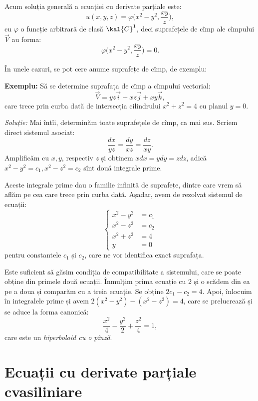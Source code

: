 Acum soluția generală a ecuației cu derivate parțiale este:
\[
  u(x, y, z) = \varphi\Big(x^2 - y^2, \dfrac{xy}{z} \Big),
\]
cu $ \varphi $ o funcție arbitrară de clasă $ \kal{C}^1 $, deci suprafețele de
cîmp ale cîmpului $ \vec{V} $ au forma:
\[
  \varphi\Big( x^2 - y^2, \dfrac{xy}{z} \Big) = 0.
\]

\vspace{1cm}

În unele cazuri, se pot cere anume suprafețe de cîmp, de exemplu:

\textbf{Exemplu:} Să se determine suprafața de cîmp a cîmpului vectorial:
\[
  \vec{V} = yz\vec{i} + xz \vec{j} + xy\vec{k},
\]
care trece prin curba dată de intersecția cilindrului $ x^2 + z^2 = 4 $ cu
planul $ y = 0 $.

\emph{Soluție:} Mai întîi, determinăm toate suprafețele de cîmp, ca mai sus.
Scriem direct sistemul asociat:
\[
  \dfrac{dx}{yz} = \dfrac{dy}{xz} = \dfrac{dz}{xy}.
\]
Amplificăm cu $ x, y $, respectiv $ z $ și obținem $ xdx = ydy = zdz $, adică
$ x^2 - y^2 = c_1, x^2 - z^2 = c_2 $ sînt două integrale prime.

Aceste integrale prime dau o familie infinită de suprafețe, dintre care
vrem să aflăm pe cea care trece prin curba dată. Așadar, avem de rezolvat
sistemul de ecuații:
\[
  \begin{cases}
    x^2 - y^2 &= c_1  \\
    x^2 - z^2 &= c_2 \\
    x^2 + z^2 &= 4 \\
    y &= 0
  \end{cases}
\]
pentru constantele $ c_1 $ și $ c_2 $, care ne vor identifica exact suprafața.

Este suficient să găsim condiția de compatibilitate a sistemului, care se poate
obține din primele două ecuații. Înmulțim prima ecuație cu 2 și o scădem din ea
pe a doua și comparăm cu a treia ecuație. Se obține $ 2c_1 - c_2 = 4 $.
Apoi, înlocuim în integralele prime și avem $ 2(x^2 - y^2) - (x^2 - z^2) = 4 $, care
se prelucrează și se aduce la forma canonică:
\[
  \dfrac{x^2}{4} - \dfrac{y^2}{2} + \dfrac{z^2}{4} = 1,
\]
care este un \emph{hiperboloid cu o pînză}.


\section{Ecuații cu derivate parțiale cvasiliniare}

